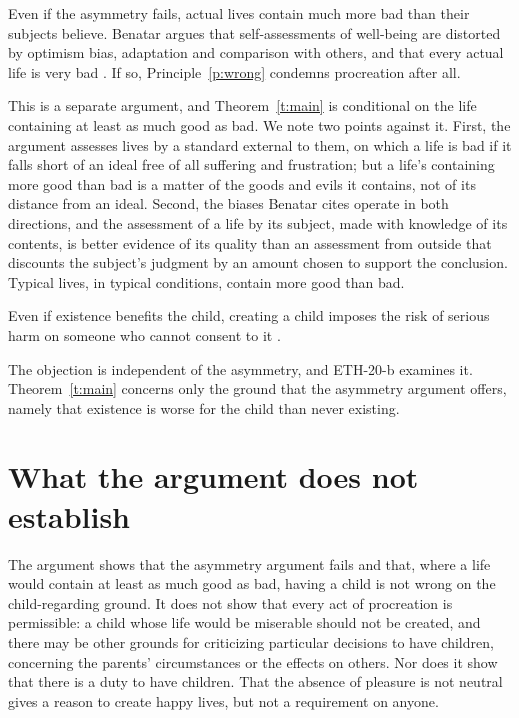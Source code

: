 \documentclass{situationist-preprint}
\begin{document}
\begin{objection}
Even if the asymmetry fails, actual lives contain much more bad than their subjects believe. Benatar argues that self-assessments of well-being are distorted by optimism bias, adaptation and comparison with others, and that every actual life is very bad \citep[ch.~3]{Benatar2006}. If so, Principle~\ref{p:wrong} condemns procreation after all.
\end{objection}

\begin{reply}
This is a separate argument, and Theorem~\ref{t:main} is conditional on the life containing at least as much good as bad. We note two points against it. First, the argument assesses lives by a standard external to them, on which a life is bad if it falls short of an ideal free of all suffering and frustration; but a life's containing more good than bad is a matter of the goods and evils it contains, not of its distance from an ideal. Second, the biases Benatar cites operate in both directions, and the assessment of a life by its subject, made with knowledge of its contents, is better evidence of its quality than an assessment from outside that discounts the subject's judgment by an amount chosen to support the conclusion. Typical lives, in typical conditions, contain more good than bad.
\end{reply}

\begin{objection}[Consent]
Even if existence benefits the child, creating a child imposes the risk of serious harm on someone who cannot consent to it \citep{Shiffrin1999}.
\end{objection}

\begin{reply}
The objection is independent of the asymmetry, and ETH-20-b examines it. Theorem~\ref{t:main} concerns only the ground that the asymmetry argument offers, namely that existence is worse for the child than never existing.
\end{reply}

\section{What the argument does not establish}

The argument shows that the asymmetry argument fails and that, where a life would contain at least as much good as bad, having a child is not wrong on the child-regarding ground. It does not show that every act of procreation is permissible: a child whose life would be miserable should not be created, and there may be other grounds for criticizing particular decisions to have children, concerning the parents' circumstances or the effects on others. Nor does it show that there is a duty to have children. That the absence of pleasure is not neutral gives a reason to create happy lives, but not a requirement on anyone.
\end{document}
